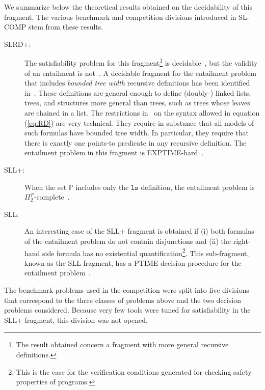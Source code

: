 \documentclass{llncs}
\newcommand{\preds}{\mathbb{P}}
\newcommand{\ls}{\mathtt{ls}}
\begin{document}
We summarize below the theoretical results obtained on the decidability of this fragment.
The various benchmark and competition divisions introduced in SL-COMP stem from these results.
\begin{description}
\item[SLRD+:]
The satisfiability problem for this fragment\footnote{The result obtained concern a fragment with more general recursive definitions.} is decidable~\cite{BrotherstonFGNP13},
but the validity of an entailment is not~\cite{AntonopoulosGHKO14}.
%
A decidable fragment for the entailment problem that includes \emph{bounded tree width} recursive definitions has been identified in~\cite{IosifRS13}.
These definitions are general enough to define (doubly-) linked lists, trees,
and structures more general than trees, such as trees whose leaves are chained in
a list. 
The restrictions in~\cite{IosifRS13} on the syntax allowed in equation (\ref{eq:RD}) are very technical. They require in substance that all models of such formulas have bounded tree width. 
In particular, they require that there is exactly one points-to predicate in any recursive definition.
The entailment problem in this fragment is EXPTIME-hard~\cite{AntonopoulosGHKO14}.

\item[SLL+:]
When the set $\preds$ includes only the $\ls$ definition, 
the entailment problem is $\Pi^P_2$-complete~\cite{AntonopoulosGHKO14}.

\item[SLL:]
An interesting case of the SLL+ fragment is obtained if 
(i) both formulas of the entailment problem do not contain disjunctions and 
(ii) the right-hand side formula has no existential quantification\footnote{This is the case for the verification conditions generated for checking safety properties of programs.}. 
This sub-fragment, known as the SLL fragment, has a PTIME decision procedure for the entailment problem~\cite{CookHOPW11}.
\end{description}

The benchmark problems used in the competition were split into five divisions that correspond to the three classes of problems above and the two decision problems considered.
Because very few tools were tuned for satisfiability in the SLL+ fragment, this division was not opened.



\end{document}
